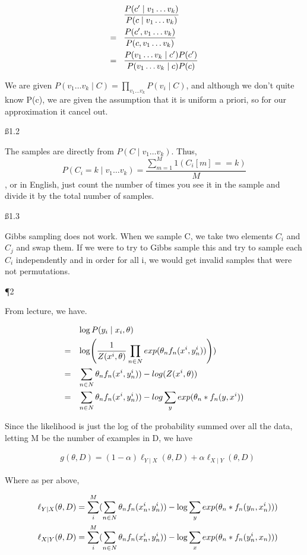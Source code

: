 \begin{align*}
& \frac{P(c' \mid v_1 \dots v_k)}{P(c \mid v_1 \dots v_k)} \nl
\frac{P(c', v_1 \dots v_k)}{P(c, v_1 \dots v_k)} \nl
\frac{P(v_1 \dots v_k \mid c') P(c')}{P(v_1 \dots v_k \mid c) P(c)}
\end{align*}

We are given $P(v_1 \dots v_k \mid C) = \prod_{v_1 \dots v_k} P(v_i \mid C)$, and although we don't quite know P(c), we are given the assumption that it is uniform a priori, so for our approximation it cancel out.

\ss {1.2}

The samples are directly from $P(C \mid v_1 \dots v_k)$. Thus,
\[P(C_i = k \mid v_1 \dots v_k) = \frac{\sum_{m=1}^M 1(C_i[m]==k)}{M}
\], or in English, just count the number of times you see it in the sample and divide it by the total number of samples.

\ss {1.3}

Gibbs sampling does not work. When we sample C, we take two elements $C_i$ and $C_j$ and swap them. If we were to try to Gibbs sample this and try to sample each $C_i$ independently and in order for all i, we would get invalid samples that were not permutations.

\P 2

From lecture, we have.

\begin{align*}
& \log P(y_i \mid x_i, \theta) \nl \log(\frac{1}{Z(x^i, \theta)} \prod_{n \in N} exp(\theta_n f_n(x^i,y_n^i)))) \nl
\sum_{n \in N} \theta_n f_n(x^i,y_n^i)) - log(Z(x^i, \theta)) \nl
\sum_{n \in N} \theta_n f_n(x^i,y_n^i)) - log \sum_y exp(\theta_n * f_n(y,x^i))
\end{align*}

Since the likelihood is just the log of the probability summed over all the data, letting M be the number of examples in D, we have

\begin{align*}
& g(\theta, D) = (1-\alpha)\ell_{Y \mid X}(\theta, D) + \alpha\ell_{X \mid Y}(\theta,D)
\end{align*}

Where as per above,

\begin{align*}
&\ell_{Y \mid X}(\theta, D) = \sum_i^M (\sum_{n \in N} \theta_n f_n(x_n^i,y_n^i)) - \log \sum_y exp(\theta_n * f_n(y_n,x_n^i))) \\ \sp &
\ell_{X \mid Y}(\theta, D) = \sum_i^M (\sum_{n \in N} \theta_n f_n(x_n^i,y_n^i)) - \log \sum_x exp(\theta_n * f_n(y_n^i,x_n)))
\end{align*}

